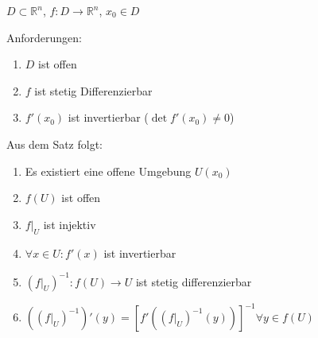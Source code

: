 \documentclass[twoside]{article}
\begin{document}
\begin{enumerate}[1.]
						\begin{math} D \subset \mathbb{R}^n \end{math}, \begin{math} f: D \to \mathbb{R}^n \end{math}, \begin{math} x_0 \in D \end{math}
						
						Anforderungen:
						\begin{enumerate}[-]
							\item \begin{math} D \end{math} ist offen
							\item \begin{math} f \end{math} ist stetig Differenzierbar
							\item \begin{math} f'(x_0) \end{math} ist invertierbar (\begin{math} \det f'(x_0) \ne 0 \end{math})
						\end{enumerate}
						
						Aus dem Satz folgt:
						\begin{enumerate}[-]
							\item Es existiert eine offene Umgebung \begin{math} U(x_0) \end{math}
							\item \begin{math} f(U) \end{math} ist offen
							\item \begin{math} f|_U \end{math} ist injektiv
							\item \begin{math} \forall x \in U : f'(x) \end{math} ist invertierbar
							\item \begin{math} (f|_U)^{-1}: f(U) \to U \end{math} ist stetig differenzierbar
							\item \begin{math} ((f|_U)^{-1})'(y) = [f'((f|_U)^{-1} (y))]^{-1} \forall y \in f(U) \end{math}
						\end{enumerate}
				\end{enumerate}
			
\end{document}
